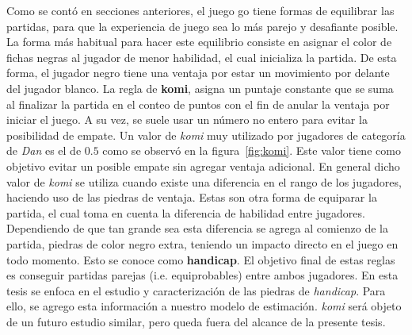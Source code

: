 \documentclass[11pt,twoside, spanish]{report} %
\begin{document}
Como se cont\'o en secciones anteriores, el juego go tiene formas de equilibrar las partidas, para que la experiencia de juego sea lo m\'as parejo y desafiante posible.
La forma m\'as habitual para hacer este equilibrio consiste en asignar el color de fichas negras al jugador de menor habilidad, el cual inicializa la partida.
De esta forma, el jugador negro tiene una ventaja por estar un movimiento por delante del jugador blanco.
La regla de \textbf{komi}, asigna un puntaje constante que se suma al finalizar la partida en el conteo de puntos con el fin de anular la ventaja por iniciar el juego.
A su vez, se suele usar un n\'umero no entero para evitar la posibilidad de empate.
Un valor de \emph{komi} muy utilizado por jugadores de categor\'ia de \textit{Dan} es el de $0.5$  como se observ\'o en la figura~\ref{fig:komi}.
Este valor tiene como objetivo evitar un posible empate sin agregar ventaja adicional.
En general dicho valor de \textit{komi} se utiliza cuando existe una diferencia en el rango de los jugadores, haciendo uso de las piedras de ventaja.
Estas son otra forma de equiparar la partida, el cual toma en cuenta la diferencia de habilidad entre jugadores.
Dependiendo de que tan grande sea esta diferencia se agrega al comienzo de la partida, piedras de color negro extra, teniendo un impacto directo en el juego en todo momento. 
Esto se conoce como \textbf{handicap}.
El objetivo final de estas reglas es conseguir partidas parejas (i.e. equiprobables) entre ambos jugadores.
En esta tesis se enfoca en el estudio y caracterizaci\'on de las piedras de \textit{handicap}.
Para ello, se agrego esta informaci\'on a nuestro modelo de estimaci\'on.
\textit{komi} ser\'a objeto de un futuro estudio similar, pero queda fuera del alcance de la presente tesis.
\end{document}
